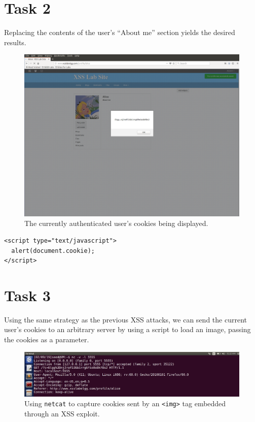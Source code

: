 \documentclass[12pt,letterpaper]{article}
\begin{document}
	\pagebreak
	
	\section*{Task 2}
		Replacing the contents of the user's ``About me'' section yields the desired results.
		
		\begin{figure}[h!]
			\includegraphics[width=\linewidth]{task-2}
			\caption{The currently authenticated user's cookies being displayed.}
		\end{figure}
	
		\begin{lstlisting}[caption={The code to display the current user's cookie}]
<script type="text/javascript">
  alert(document.cookie);
</script>
		\end{lstlisting}
	
	\section*{Task 3}
		Using the same strategy as the previous XSS attacks, we can send the current user's cookies to an arbitrary server by using a script to load an image, passing the cookies as a parameter.
		
		\begin{figure}[h]
			\includegraphics[width=\linewidth]{task-3-netcat-cookie}
			\caption{Using \texttt{netcat} to capture cookies sent by an \texttt{<img>} tag embedded through an XSS exploit.}
		\end{figure}
	
\end{document}
